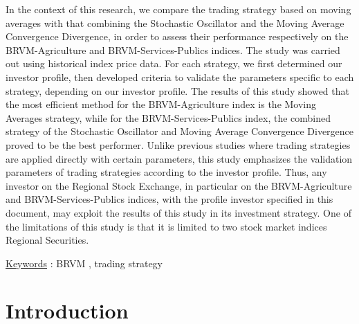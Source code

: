 In the context of this research, we compare the trading strategy based
on moving averages with that combining the Stochastic Oscillator and the
Moving Average Convergence Divergence, in order to assess their
performance respectively on the BRVM-Agriculture and
BRVM-Services-Publics indices. The study was carried out using
historical index price data. For each strategy, we first determined our
investor profile, then developed criteria to validate the parameters
specific to each strategy, depending on our investor profile. The
results of this study showed that the most efficient method for the
BRVM-Agriculture index is the Moving Averages strategy, while for the
BRVM-Services-Publics index, the combined strategy of the Stochastic
Oscillator and Moving Average Convergence Divergence proved to be the
best performer. Unlike previous studies where trading strategies are
applied directly with certain parameters, this study emphasizes the
validation parameters of trading strategies according to the investor
profile. Thus, any investor on the Regional Stock Exchange, in
particular on the BRVM-Agriculture and BRVM-Services-Publics indices,
with the profile investor specified in this document, may exploit the
results of this study in its investment strategy. One of the limitations
of this study is that it is limited to two stock market indices Regional
Securities.

\ul{Keywords} : BRVM , trading strategy

\section*{Introduction}\label{introduction}

